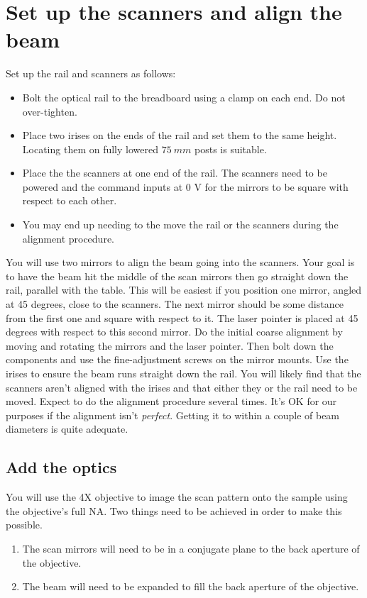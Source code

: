 \documentclass[a4paper]{report}
\begin{document}
\section{Set up the scanners and align the beam}
Set up the rail and scanners as follows:
\begin{itemize}
\setlength\itemsep{0.15em}
\item Bolt the optical rail to the breadboard using a clamp on each end. Do not over-tighten. 
\item Place two irises on the ends of the rail and set them to the same height. 
Locating them on fully lowered $75~mm$ posts is suitable. 
\item Place the the scanners at one end of the rail.
The scanners need to be powered and the command inputs at 0 V for the mirrors to be square with respect to each other. 
\item You may end up needing to the move the rail or the scanners during the alignment procedure.
\end{itemize}

\vspace{1.5em}

You will use two mirrors to align the beam going into the scanners.
Your goal is to have the beam hit the middle of the scan mirrors then go straight down the rail, parallel with the table. 
This will be easiest if you position one mirror, angled at 45 degrees, close to the scanners.
The next mirror should be some distance from the first one and square with respect to it. 
The laser pointer is placed at 45 degrees with respect to this second mirror. 
Do the initial coarse alignment by moving and rotating the mirrors and the laser pointer. 
Then bolt down the components and use the fine-adjustment screws on the mirror mounts. 
Use the irises to ensure the beam runs straight down the rail. 
You will likely find that the scanners aren't aligned with the irises and that either they or the rail need to be moved. 
Expect to do the alignment procedure several times. 
It's OK for our purposes if the alignment isn't \textit{perfect}. 
Getting it to within a couple of beam diameters is quite adequate. 


\subsection{Add the optics}
You will use the 4X objective to image the scan pattern onto the sample using the objective's full NA. 
Two things need to be achieved in order to make this possible. 
\begin{enumerate}
\setlength\itemsep{0.1em}
\item The scan mirrors will need to be in a conjugate plane to the back aperture of the objective. 
\item The beam will need to be expanded to fill the back aperture of the objective. 
\end{enumerate}
\end{document}
